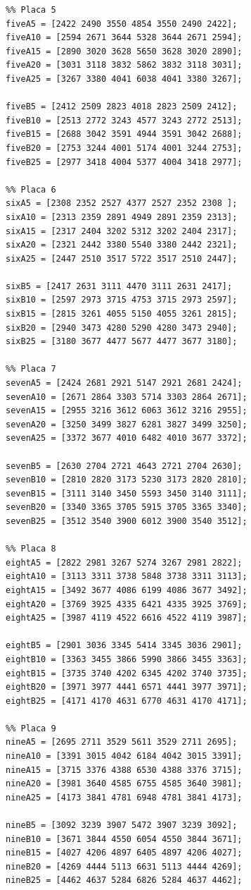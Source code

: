 \begin{lstlisting}
%% Placa 5
fiveA5 = [2422 2490 3550 4854 3550 2490 2422];
fiveA10 = [2594 2671 3644 5328 3644 2671 2594];
fiveA15 = [2890 3020 3628 5650 3628 3020 2890];
fiveA20 = [3031 3118 3832 5862 3832 3118 3031];
fiveA25 = [3267 3380 4041 6038 4041 3380 3267];

fiveB5 = [2412 2509 2823 4018 2823 2509 2412];
fiveB10 = [2513 2772 3243 4577 3243 2772 2513];
fiveB15 = [2688 3042 3591 4944 3591 3042 2688];
fiveB20 = [2753 3244 4001 5174 4001 3244 2753];
fiveB25 = [2977 3418 4004 5377 4004 3418 2977];

%% Placa 6
sixA5 = [2308 2352 2527 4377 2527 2352 2308 ];
sixA10 = [2313 2359 2891 4949 2891 2359 2313];
sixA15 = [2317 2404 3202 5312 3202 2404 2317];
sixA20 = [2321 2442 3380 5540 3380 2442 2321];
sixA25 = [2447 2510 3517 5722 3517 2510 2447];

sixB5 = [2417 2631 3111 4470 3111 2631 2417];
sixB10 = [2597 2973 3715 4753 3715 2973 2597];
sixB15 = [2815 3261 4055 5150 4055 3261 2815];
sixB20 = [2940 3473 4280 5290 4280 3473 2940];
sixB25 = [3180 3677 4477 5677 4477 3677 3180];

%% Placa 7
sevenA5 = [2424 2681 2921 5147 2921 2681 2424];
sevenA10 = [2671 2864 3303 5714 3303 2864 2671];
sevenA15 = [2955 3216 3612 6063 3612 3216 2955];
sevenA20 = [3250 3499 3827 6281 3827 3499 3250];
sevenA25 = [3372 3677 4010 6482 4010 3677 3372];

sevenB5 = [2630 2704 2721 4643 2721 2704 2630];
sevenB10 = [2810 2820 3173 5230 3173 2820 2810];
sevenB15 = [3111 3140 3450 5593 3450 3140 3111];
sevenB20 = [3340 3365 3705 5915 3705 3365 3340];
sevenB25 = [3512 3540 3900 6012 3900 3540 3512];

%% Placa 8
eightA5 = [2822 2981 3267 5274 3267 2981 2822];
eightA10 = [3113 3311 3738 5848 3738 3311 3113];
eightA15 = [3492 3677 4086 6199 4086 3677 3492];
eightA20 = [3769 3925 4335 6421 4335 3925 3769];
eightA25 = [3987 4119 4522 6616 4522 4119 3987];

eightB5 = [2901 3036 3345 5414 3345 3036 2901];
eightB10 = [3363 3455 3866 5990 3866 3455 3363];
eightB15 = [3735 3740 4202 6345 4202 3740 3735];
eightB20 = [3971 3977 4441 6571 4441 3977 3971];
eightB25 = [4171 4170 4631 6770 4631 4170 4171];

%% Placa 9
nineA5 = [2695 2711 3529 5611 3529 2711 2695];
nineA10 = [3391 3015 4042 6184 4042 3015 3391];
nineA15 = [3715 3376 4388 6530 4388 3376 3715];
nineA20 = [3981 3640 4585 6755 4585 3640 3981];
nineA25 = [4173 3841 4781 6948 4781 3841 4173];

nineB5 = [3092 3239 3907 5472 3907 3239 3092];
nineB10 = [3671 3844 4550 6054 4550 3844 3671];
nineB15 = [4027 4206 4897 6405 4897 4206 4027];
nineB20 = [4269 4444 5113 6631 5113 4444 4269];
nineB25 = [4462 4637 5284 6826 5284 4637 4462];


\end{lstlisting}
